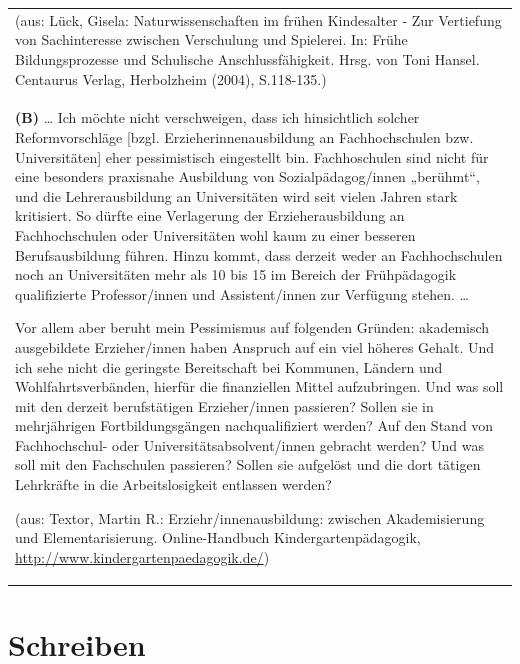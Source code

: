 \documentclass[]{book}
\theoremstyle{definition}
\theoremstyle{definition}
\theoremstyle{definition}
\theoremstyle{remark}
\begin{document}
\begin{longtable}[]{@{}l@{}}
\begin{minipage}[t]{0.97\columnwidth}
(aus: Lück, Gisela: Naturwissenschaften im frühen Kindesalter - Zur
Vertiefung von Sachinteresse zwischen Verschulung und Spielerei. In:
Frühe Bildungsprozesse und Schulische Anschlussfähigkeit. Hrsg. von Toni
Hansel. Centaurus Verlag, Herbolzheim (2004), S.118-135.)
\vspace{-6mm}\strut
\end{minipage}\tabularnewline
\begin{minipage}[t]{0.97\columnwidth}\raggedright\strut
\textbf{(B)} \ldots{} Ich möchte nicht verschweigen, dass ich
hinsichtlich solcher Reformvorschläge {[}bzgl. Erzieherinnenausbildung
an Fachhochschulen bzw. Universitäten{]} eher pessimistisch eingestellt
bin. Fachhoschulen sind nicht für eine besonders praxisnahe Ausbildung
von Sozialpädagog/innen „berühmt``, und die Lehrerausbildung an
Universitäten wird seit vielen Jahren stark kritisiert. So dürfte eine
Verlagerung der Erzieherausbildung an Fachhochschulen oder Universitäten
wohl kaum zu einer besseren Berufsausbildung führen. Hinzu kommt, dass
derzeit weder an Fachhochschulen noch an Universitäten mehr als 10 bis
15 im Bereich der Frühpädagogik qualifizierte Professor/innen und
Assistent/innen zur Verfügung stehen. \ldots{}

Vor allem aber beruht mein Pessimismus auf folgenden Gründen: akademisch
ausgebildete Erzieher/innen haben Anspruch auf ein viel höheres Gehalt.
Und ich sehe nicht die geringste Bereitschaft bei Kommunen, Ländern und
Wohlfahrtsverbänden, hierfür die finanziellen Mittel aufzubringen. Und
was soll mit den derzeit berufstätigen Erzieher/innen passieren? Sollen
sie in mehrjährigen Fortbildungsgängen nachqualifiziert werden? Auf den
Stand von Fachhochschul- oder Universitätsabsolvent/innen gebracht
werden? Und was soll mit den Fachschulen passieren? Sollen sie aufgelöst
und die dort tätigen Lehrkräfte in die Arbeitslosigkeit entlassen
werden?

(aus: Textor, Martin R.: Erziehr/innenausbildung: zwischen
Akademisierung und Elementarisierung. Online-Handbuch
Kindergartenpädagogik,
\url{http://www.kindergartenpaedagogik.de/})\strut
\end{minipage}\tabularnewline
\bottomrule
\end{longtable}

\chapter{Schreiben}\label{schreiben}
\end{document}
